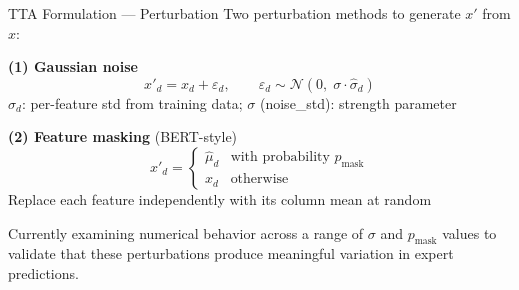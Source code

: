 \documentclass[aspectratio=169]{beamer}
\begin{document}
\begin{frame}{TTA Formulation --- Perturbation}
  Two perturbation methods to generate $x'$ from $x$:

  \vspace{0.5em}
  \textbf{(1) Gaussian noise}
  \[
    x'_d = x_d + \varepsilon_d,
    \qquad
    \varepsilon_d \sim \mathcal{N}\!\left(0,\; \sigma \cdot \hat{\sigma}_d\right)
  \]
  $\hat{\sigma}_d$: per-feature std from training data;\quad
  $\sigma$ (noise\_std): strength parameter

  \vspace{0.5em}
  \textbf{(2) Feature masking} (BERT-style)
  \[
    x'_d =
    \begin{cases}
      \hat{\mu}_d & \text{with probability } p_{\text{mask}} \\
      x_d         & \text{otherwise}
    \end{cases}
  \]
  Replace each feature independently with its column mean at random

  \vspace{0.5em}
  \begin{block}{}
    Currently examining numerical behavior across a range of $\sigma$ and
    $p_{\text{mask}}$ values to validate that these perturbations produce
    meaningful variation in expert predictions.
  \end{block}
\end{frame}
\end{document}
